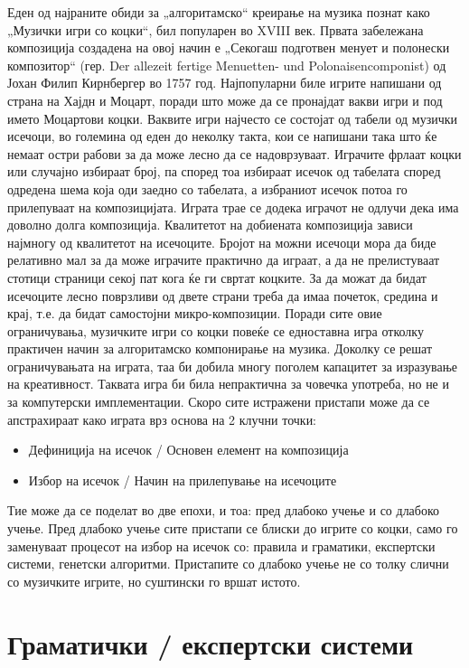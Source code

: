 Еден од најраните обиди за „алгоритамско“ креирање на музика познат како „Музички игри со коцки“, бил популарен во XVIII век. Првата забележана композиција создадена на овој начин е „Секогаш подготвен менует и полонески композитор“ (гер. Der allezeit fertige Menuetten- und Polonaisencomponist) од Јохан Филип Кирнбергер во 1757 год. Најпопуларни биле игрите напишани од страна на Хајдн и Моцарт, поради што може да се пронајдат вакви игри и под името Моцартови коцки. Ваквите игри најчесто се состојат од табели од музички исечоци, во големина од еден до неколку такта, кои се напишани така што ќе немаат остри рабови за да може лесно да се надоврзуваат. Играчите фрлаат коцки или случајно избираат број, па според тоа избираат исечок од табелата според одредена шема која оди заедно со табелата, а избраниот исечок потоа го прилепуваат на композицијата. Играта трае се додека играчот не одлучи дека има доволно долга композиција. Квалитетот на добиената композиција зависи најмногу од квалитетот на исечоците. Бројот на можни исечоци мора да биде релативно мал за да може играчите практично да играат, а да не прелистуваат стотици страници секој пат кога ќе ги свртат коцките. За да можат да бидат исечоците лесно поврзливи од двете страни треба да имаа почеток, средина и крај, т.е. да бидат самостојни микро-композиции. Поради сите овие ограничувања, музичките игри со коцки повеќе се едноставна игра отколку практичен начин за алгоритамско компонирање на музика. Доколку се решат ограничувањата на играта, таа би добила многу поголем капацитет за изразување на креативност. Таквата игра би била непрактична за човечка употреба, но не и за компутерски имплементации. Скоро сите истражени пристапи може да се апстрахираат како играта врз основа на 2 клучни точки:
\begin{itemize}
    \item Дефиниција на исечок / Основен елемент на композиција 
    \item Избор на исечок / Начин на прилепување на исечоците
\end{itemize}
Тие може да се поделат во две епохи, и тоа: пред длабоко учење и со длабоко учење. Пред длабоко учење сите пристапи се блиски до игрите со коцки, само го заменуваат процесот на избор на исечок со: правила и граматики, експертски системи, генетски алгоритми. Пристапите со длабоко учење не со толку слични со музичките игрите, но суштински го вршат истото. 

\section{Граматички / експертски системи} 

